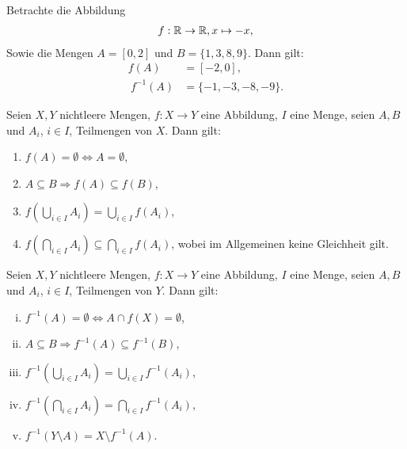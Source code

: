 \begin{example}
    Betrachte die Abbildung 
    \begin{align*}
        f: \mathbb{R} \to \mathbb{R}, x \mapsto -x,
    \end{align*}
    Sowie die Mengen $A = [0,2]$ und $B = \{1,3,8,9\}$. Dann gilt: 
    \begin{align*}
        f(A) &= [-2,0], \\\
        f^{-1}(A) &= \{-1, -3,-8,-9\}. 
    \end{align*}
\end{example}

\begin{theorem}
    Seien $X,Y$ nichtleere Mengen, $f:X \to Y$ eine Abbildung, $I$ eine Menge, seien $A,B$ und $A_i$, $i \in I$, Teilmengen von $X$. Dann gilt: 
    \begin{enumerate}
        \item
        $f(A) = \emptyset \iff A = \emptyset$, 
        \item 
        $A \subseteq B \Rightarrow f(A) \subseteq f(B)$,
        \item 
        $ f(\bigcup_{i \in I}A_i) = \bigcup_{i \in I}f(A_i)$,
        \item 
        $ f(\bigcap_{i \in I}A_i) \subseteq \bigcap_{i \in I}f(A_i)$, wobei im Allgemeinen keine Gleichheit gilt. 
    \end{enumerate}
\end{theorem}

\begin{proof*}
\end{proof*}

\begin{theorem}
    Seien $X,Y$ nichtleere Mengen, $f:X \to Y$ eine Abbildung, $I$ eine Menge, seien $A,B$ und $A_i$, $i \in I$, Teilmengen von $Y$. Dann gilt: 
    \begin{enumerate}[(i)]
        \item 
        $f^{-1}(A) = \emptyset \iff A \cap f(X) = \emptyset$,
        \item 
        $A \subseteq B \Rightarrow f^{-1}(A) \subseteq f^{-1}(B)$,
        \item 
        $f^{-1}(\bigcup_{i \in I}A_i) = \bigcup_{i \in I}f^{-1}(A_i)$,
        \item 
        $f^{-1}(\bigcap_{i \in I}A_i) = \bigcap_{i \in I}f^{-1}(A_i)$,
        \item 
        $f^{-1}(Y \setminus A) = X \setminus f^{-1}(A)$.
    \end{enumerate}
\end{theorem}

\begin{proof*}
\end{proof*}

